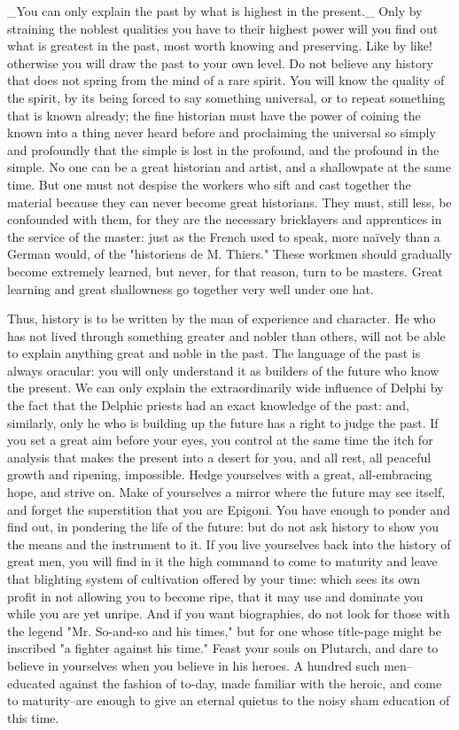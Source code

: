 _You can only explain the past by what is highest in the present._
Only by straining the noblest qualities you have to their highest
power will you find out what is greatest in the past, most worth
knowing and preserving. Like by like! otherwise you will draw the
past to your own level. Do not believe any history that does not
spring from the mind of a rare spirit. You will know the quality of
the spirit, by its being forced to say something universal, or to
repeat something that is known already; the fine historian must have
the power of coining the known into a thing never heard before and
proclaiming the universal so simply and profoundly that the simple is
lost in the profound, and the profound in the simple. No one can be a
great historian and artist, and a shallowpate at the same time. But
one must not despise the workers who sift and cast together the
material because they can never become great historians. They must,
still less, be confounded with them, for they are the necessary
bricklayers and apprentices in the service of the master: just as the
French used to speak, more naïvely than a German would, of the
"historiens de M. Thiers." These workmen should gradually become
extremely learned, but never, for that reason, turn to be masters.
Great learning and great shallowness go together very well under one
hat.

Thus, history is to be written by the man of experience and
character. He who has not lived through something greater and nobler
than others, will not be able to explain anything great and noble in
the past. The language of the past is always oracular: you will only
understand it as builders of the future who know the present. We can
only explain the extraordinarily wide influence of Delphi by the fact
that the Delphic priests had an exact knowledge of the past: and,
similarly, only he who is building up the future has a right to judge
the past. If you set a great aim before your eyes, you control at the
same time the itch for analysis that makes the present into a desert
for you, and all rest, all peaceful growth and ripening, impossible.
Hedge yourselves with a great, all-embracing hope, and strive on.
Make of yourselves a mirror where the future may see itself, and
forget the superstition that you are Epigoni. You have enough to
ponder and find out, in pondering the life of the future: but do not
ask history to show you the means and the instrument to it. If you
live yourselves back into the history of great men, you will find in
it the high command to come to maturity and leave that blighting
system of cultivation offered by your time: which sees its own profit
in not allowing you to become ripe, that it may use and dominate you
while you are yet unripe. And if you want biographies, do not look
for those with the legend "Mr. So-and-so and his times," but for one
whose title-page might be inscribed "a fighter against his time."
Feast your souls on Plutarch, and dare to believe in yourselves when
you believe in his heroes. A hundred such men--educated against the
fashion of to-day, made familiar with the heroic, and come to
maturity--are enough to give an eternal quietus to the noisy sham
education of this time.


